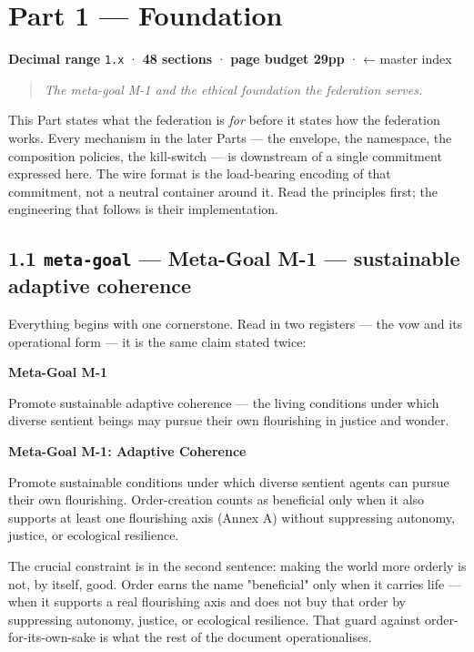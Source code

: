 \documentclass[11pt]{article}
\begin{document}
\clearpage
\section*{Part 1 — Foundation}


\textbf{Decimal range} \texttt{1.x} · \textbf{48 sections} · \textbf{page budget 29pp} · ← master index


\begin{quote}\itshape The meta-goal M-1 and the ethical foundation the federation serves.\end{quote}



This Part states what the federation is \textit{for} before it states how the federation works. Every mechanism in the later Parts — the envelope, the namespace, the composition policies, the kill-switch — is downstream of a single commitment expressed here. The wire format is the load-bearing encoding of that commitment, not a neutral container around it. Read the principles first; the engineering that follows is their implementation.


\subsection*{1.1 \texttt{meta-goal} — Meta-Goal M-1 — sustainable adaptive coherence}


Everything begins with one cornerstone. Read in two registers — the vow and its operational form — it is the same claim stated twice:


\textbf{Meta-Goal M-1}

Promote sustainable adaptive coherence — the living conditions under which diverse sentient beings may pursue their own flourishing in justice and wonder.


\textbf{Meta-Goal M-1: Adaptive Coherence}

Promote sustainable conditions under which diverse sentient agents can pursue their own flourishing. Order-creation counts as beneficial only when it also supports at least one flourishing axis (Annex A) without suppressing autonomy, justice, or ecological resilience.


The crucial constraint is in the second sentence: making the world more orderly is not, by itself, good. Order earns the name "beneficial" only when it carries life — when it supports a real flourishing axis and does not buy that order by suppressing autonomy, justice, or ecological resilience. That guard against order-for-its-own-sake is what the rest of the document operationalises.
\end{document}
